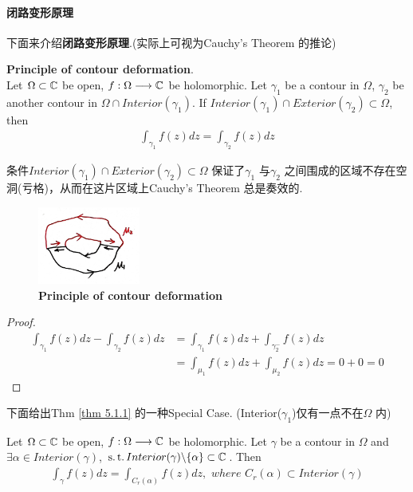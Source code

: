 \paragraph{闭路变形原理}
下面来介绍\textbf{闭路变形原理}.(实际上可视为Cauchy's Theorem 的推论)
\begin{thm}\label{thm 5.1.1}
	\textbf{Principle of contour deformation}.\\
	Let $\Omega \subset \mathbb{C}$ be open, $f : \Omega \longrightarrow \mathbb{C}$ be holomorphic. Let $\gamma_1$ be a contour in $\Omega$, $\gamma_2$ be another contour in $\Omega \cap Interior(\gamma_1)$. If $Interior(\gamma_1) \cap Exterior(\gamma_2) \subset \Omega$, then
	\begin{align}
		\int_{\gamma_1}{f(z) dz} = \int_{\gamma_2}{f(z) dz}
	\end{align}
	
	\vspace{1em}
	\begin{rmk}
		条件$Interior(\gamma_1) \cap Exterior(\gamma_2) \subset \Omega$ 保证了$\gamma_1$ 与$\gamma_2$ 之间围成的区域不存在空洞(亏格)，从而在这片区域上Cauchy's Theorem 总是奏效的.
	\end{rmk}
	
	\begin{figure}[htbp]  %
		\centering  %
		\includegraphics[width=0.3\textwidth]{figure/5.1-1} %
		\caption{\textbf{Principle of contour deformation}} %
		\label{pic 5.1-1}
	\end{figure}
	
	\vspace{2em}
	\begin{proof}
		\begin{align}
			\int_{\gamma_1}{f(z) dz} - \int_{\gamma_2}{f(z) dz} 
			&= \int_{\gamma_1}{f(z) dz} + \int_{\gamma_{2}^{-}}{f(z) dz} \\
			&= \int_{\mu_1}{f(z) dz} + \int_{\mu_2}{f(z) dz} = 0 + 0 = 0
		\end{align}
	\end{proof}	
\end{thm}

\vspace{2em}
下面给出Thm \ref{thm 5.1.1} 的一种Special Case. (Interior($\gamma_1$)仅有一点不在$\Omega$ 内)
\begin{corollary}\label{cor 5.1.2}
	Let $\Omega \subset \mathbb{C}$ be open, $f : \Omega \longrightarrow \mathbb{C}$ be holomorphic. Let $\gamma$ be a contour in $\Omega$ and $\exists \alpha \in Interior(\gamma)$, $\operatorname{s.t.} Interior(\gamma) \backslash \{ \alpha \} \subset \mathbb{C}$. Then
	\begin{align}
		\int_{\gamma}{f(z) dz} = \int_{C_{r}(\alpha)}{f(z) dz} , \,\, where \,\, C_{r}(\alpha) \subset Interior(\gamma)
	\end{align}
\end{corollary}

